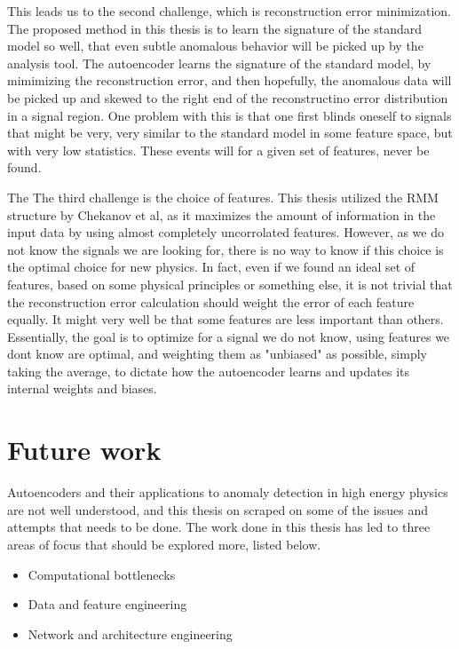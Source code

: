This leads us to the second challenge, which is reconstruction error minimization. The proposed method in this thesis is to 
learn the signature of the standard model so well, that even subtle anomalous behavior will be picked up by the analysis tool. 
The autoencoder learns the signature of the standard model, by mimimizing the reconstruction error, and then hopefully, the 
anomalous data will be picked up and skewed to the right end of the reconstructino error distribution in a signal region. 
One problem with this is that one first blinds oneself to signals that might be very, very similar to the standard model in some 
feature space, but with very low statistics. These events will for a given set of features, never be found. \par 

The The third challenge is the choice of features. This thesis utilized the RMM structure by Chekanov et al, as it maximizes 
the amount of information in the input data by using almost completely uncorrolated features. However, as we do not know the signals 
we are looking for, there is no way to know if this choice is the optimal choice for new physics. In fact, even if we found 
an ideal set of features, based on some physical principles or something else, it is not trivial that the reconstruction error calculation
should weight the error of each feature equally. It might very well be that some features are less important than others. Essentially, 
the goal is to optimize for a signal we do not know, using features we dont know are optimal, and weighting them as "unbiased" as 
possible, simply taking the average, to dictate how the autoencoder learns and updates its internal weights and biases. 

\section{Future work}

Autoencoders and their applications to anomaly detection in high energy physics are not well understood, 
and this thesis on scraped on some of the issues and attempts that needs to be done. The work done in this 
thesis has led to three areas of focus that should be explored more, listed below. 

\begin{itemize}
    \item Computational bottlenecks 
    \item Data and feature engineering 
    \item Network and architecture engineering
\end{itemize}

